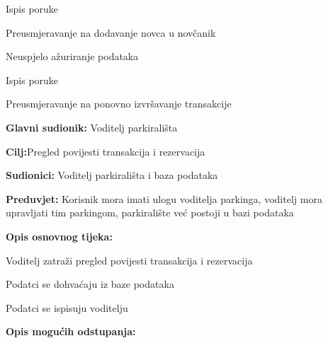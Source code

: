 \begin{packed_item}
\begin{packed_item}
\begin{packed_item}
\begin{packed_enum}
    						\item Ispis poruke
    						\item Preusmjeravanje na dodavanje novca u novčanik
    						
    					\end{packed_enum}
    					\item[3.a] Neuspjelo ažuriranje podataka
						\item[] \begin{packed_enum}
							
							\item Ispis poruke
							\item Preusmjeravanje na ponovno izvršavanje transakcije
							
						\end{packed_enum}
    					
    				\end{packed_item}
    			\end{packed_item}
    				\noindent {}
    				\begin{packed_item}
    					
    					\item \textbf{Glavni sudionik: }Voditelj parkirališta
    					\item  \textbf{Cilj:}Pregled povijesti transakcija i rezervacija 
    					\item  \textbf{Sudionici:} Voditelj parkirališta i baza podataka
    					\item  \textbf{Preduvjet:} Korisnik mora imati ulogu voditelja parkinga, voditelj mora upravljati tim parkingom, parkiralište već postoji u bazi podataka
    					\item  \textbf{Opis osnovnog tijeka:}
    					
    					\item[] \begin{packed_enum}
    						
    						\item Voditelj zatraži pregled povijesti transakcija i rezervacija
    						\item Podatci se dohvaćaju iz baze podataka
    						\item Podatci se ispisuju voditelju
    						
    					\end{packed_enum}
    					
    					\item  \textbf{Opis mogućih odstupanja:}
    					

\end{packed_item}
\end{packed_item}
